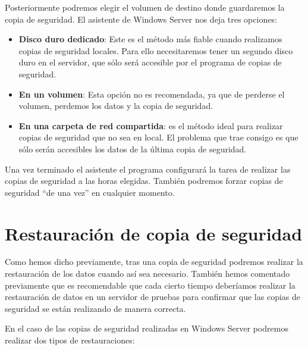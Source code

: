 Posteriormente podremos elegir el volumen de destino donde guardaremos la copia de seguridad. El asistente de Windows Server nos deja tres opciones:

\begin{itemize}
    \item \textbf{Disco duro dedicado}: Este es el método más fiable cuando realizamos copias de seguridad locales. Para ello necesitaremos tener un segundo disco duro en el servidor, que sólo será accesible por el programa de copias de seguridad.
    \item \textbf{En un volumen}: Esta opción no es recomendada, ya que de perderse el volumen, perdemos los datos y la copia de seguridad.
    \item \textbf{En una carpeta de red compartida}: es el método ideal para realizar copias de seguridad que no sea en local. El problema que trae consigo es que sólo serán accesibles los datos de la última copia de seguridad.
\end{itemize}

Una vez terminado el asistente el programa configurará la tarea de realizar las copias de seguridad a las horas elegidas. También podremos forzar copias de seguridad “de una vez” en cualquier momento.

\section{Restauración de copia de seguridad}
Como hemos dicho previamente, tras una copia de seguridad podremos realizar la restauración de los datos cuando así sea necesario. También hemos comentado previamente que es recomendable que cada cierto tiempo deberíamos realizar la restauración de datos en un servidor de pruebas para confirmar que las copias de seguridad se están realizando de manera correcta.

En el caso de las copias de seguridad realizadas en Windows Server podremos realizar dos tipos de restauraciones:

